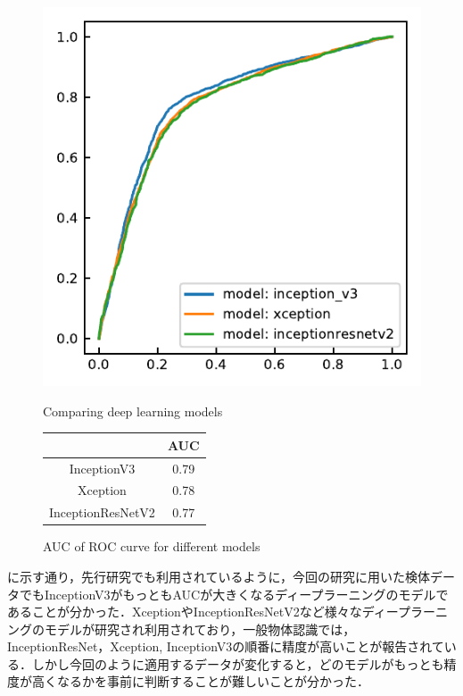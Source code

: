 \begin{figure}[H]
	\centering
	\begin{minipage}{0.4\columnwidth}
		\centering
		\includegraphics[width=\linewidth]{fig/chapter4/2dcnn_model}
		\caption{Comparing deep learning models}
		\label{fig:2dcnnmodel}
	\end{minipage}
	\makeatletter
	\def\@captype{table}
	\makeatother
	\begin{minipage}{0.4\columnwidth}
		\centering
		\caption{AUC of ROC curve for different models}
		\label{tab:2DCNNcompare_AUC}
		\begin{tabular}{cc}\toprule
			& AUC \\ \midrule
			InceptionV3 & 0.79 \\ 
			Xception & 0.78 \\ 
			InceptionResNetV2 & 0.77 \\ \bottomrule
		\end{tabular} 
	\end{minipage}
\end{figure}

に示す通り，先行研究でも利用されているように，今回の研究に用いた検体データでもInceptionV3がもっともAUCが大きくなるディープラーニングのモデルであることが分かった．XceptionやInceptionResNetV2など様々なディープラーニングのモデルが研究され利用されており，一般物体認識では，InceptionResNet，Xception, InceptionV3の順番に精度が高いことが報告されている．しかし今回のように適用するデータが変化すると，どのモデルがもっとも精度が高くなるかを事前に判断することが難しいことが分かった．

